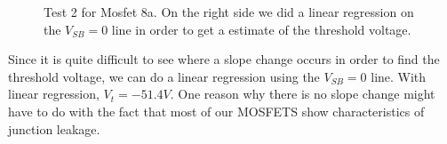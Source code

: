 \documentclass{article}
\begin{document}
\begin{figure}[H]
\centering
{}
\caption{Test 2 for Mosfet 8a. On the right side we did a linear regression on the $V_{SB} = 0$ line in order to get a estimate of the threshold voltage.}
\label{fig:8alin}
\end{figure}

Since it is quite difficult to see where a slope change occurs in order to find the threshold voltage, we can do a linear regression using the $V_{SB} = 0$ line. With linear regression, $V_t = -51.4 V$. One reason why there is no slope change might have to do with the fact that most of our MOSFETS show characteristics of junction leakage.
\end{document}
